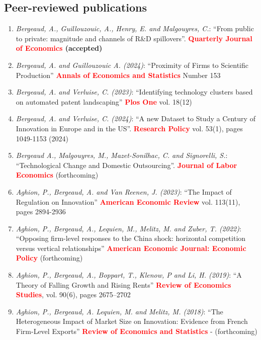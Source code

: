\documentclass[12pt]{article}
\begin{document}
\subsection*{Peer-reviewed publications}
\begin{footnotesize}
    \begin{enumerate}
    \item \emph{Bergeaud, A., Guillouzouic, A., Henry, E. and Malgouyres, C.}: ``From public to private: magnitude and channels of R\&D spillovers''. \textbf{\textcolor{red}{Quarterly Journal of Economics} (accepted)} 
    \item \emph{Bergeaud, A. and Guillouzouic A. (2024)}: ``Proximity of Firms to Scientific Production''  \textbf{\textcolor{red}{Annals of Economics and Statistics}} Number 153
    \item \emph{Bergeaud, A. and Verluise, C.  (2023)}: ``Identifying technology clusters based on automated patent landscaping'' \textbf{\textcolor{red}{Plos One}} vol. 18(12)
    \item \emph{Bergeaud, A. and Verluise, C.  (2024)}: ``A new Dataset to Study a Century of Innovation in Europe and in the US''. \textbf{\textcolor{red}{Research Policy}} vol. 53(1), pages 1049-1153 (2024)
    \item \emph{Bergeaud A., Malgouyres, M., Mazet-Sonilhac, C. and Signorelli, S.}: ``Technological Change and Domestic Outsourcing''. \textbf{\textcolor{red}{Journal of Labor Economics}} (forthcoming)
    \item \emph{Aghion, P., Bergeaud, A. and Van Reenen, J. (2023)}: ``The Impact of Regulation on Innovation'' \textbf{\textcolor{red}{American Economic Review}} vol. 113(11), pages 2894-2936
    \item \emph{Aghion, P., Bergeaud, A., Lequien, M., Melitz, M. and Zuber, T. (2022)}: ``Opposing firm-level responses to the China shock: horizontal competition versus vertical relationships'' \textbf{\textcolor{red}{American Economic Journal: Economic Policy}} (forthcoming)
    \item \emph{Aghion, P., Bergeaud, A., Boppart, T., Klenow, P and Li, H. (2019)}: ``A Theory of Falling Growth and Rising Rents'' \textbf{\textcolor{red}{Review of Economics Studies}}, vol. 90(6), pages 2675–2702 
    \item \emph{Aghion, P., Bergeaud, A. Lequien, M. and Melitz, M. (2018)}: ``The Heterogeneous Impact of Market Size on Innovation: Evidence from French Firm-Level Exports'' \textbf{\textcolor{red}{Review of Economics and Statistics}} - (forthcoming)

\end{enumerate}
\end{footnotesize}
\end{document}
